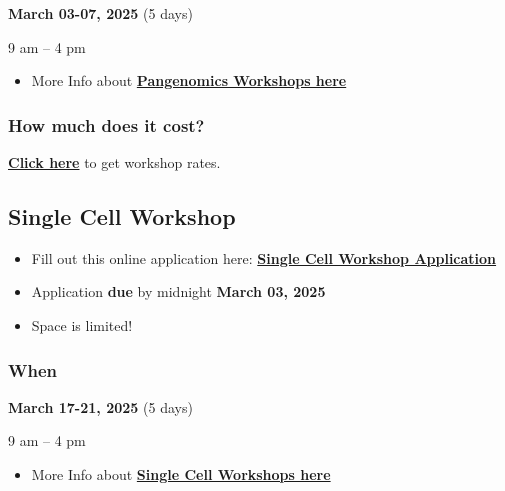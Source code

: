 \documentclass[
]{book}
\providecommand{\tightlist}{%
  \setlength{\itemsep}{0pt}\setlength{\parskip}{0pt}}
\begin{document}
\textbf{March 03-07, 2025} (5 days)

9 am -- 4 pm

\begin{itemize}
\tightlist
\item
  More Info about \href{https://inbre.ncgr.org/ncgr-workshops/pangenomics-workshop.html\#pangenomics-workshop}{\textbf{Pangenomics Workshops here}}
\end{itemize}

\hypertarget{how-much-does-it-cost}{%
\subsubsection*{How much does it cost?}\label{how-much-does-it-cost}}

\href{https://inbre.ncgr.org/ncgr-workshops/workshop-rates.html}{\textbf{Click here}} to get workshop rates.

\hypertarget{single-cell-workshop}{%
\subsection*{Single Cell Workshop}\label{single-cell-workshop}}

\begin{itemize}
\item
  Fill out this online application here:
  \href{https://forms.gle/xcfJYaHSDr4SQYUw9}{\textbf{Single Cell Workshop Application}}
\item
  Application \textbf{due} by midnight \textbf{March 03, 2025}
\item
  Space is limited!
\end{itemize}

\hypertarget{when-1}{%
\subsubsection*{When}\label{when-1}}

\textbf{March 17-21, 2025} (5 days)

9 am -- 4 pm

\begin{itemize}
\tightlist
\item
  More Info about \href{https://inbre.ncgr.org/ncgr-workshops/single-cell-rna-seq-workshop.html\#single-cell-rna-seq-workshop}{\textbf{Single Cell Workshops here}}
\end{itemize}
\end{document}
